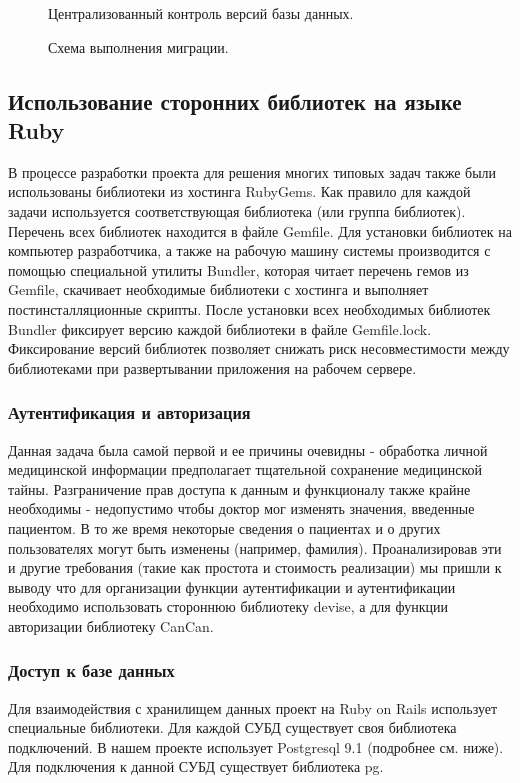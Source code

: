 \begin{figure}[h]
\caption{Централизованный контроль версий базы данных.}
\label{ris:development_migrations}
\end{figure}

\begin{figure}[h]
\caption{Схема выполнения миграции.}
\label{ris:migration_algorithm}
\end{figure}

\subsection{Использование сторонних библиотек на языке Ruby}
В процессе разработки проекта для решения многих типовых задач также были
использованы библиотеки из хостинга RubyGems. Как правило для каждой задачи
используется соответствующая библиотека (или группа библиотек). Перечень всех
библиотек находится в файле Gemfile. Для установки библиотек на компьютер
разработчика, а также на рабочую машину системы производится с помощью
специальной утилиты Bundler, которая читает перечень гемов из Gemfile, скачивает
необходимые библиотеки с хостинга и выполняет постинсталляционные скрипты. После
установки всех необходимых библиотек Bundler фиксирует версию каждой библиотеки
в файле Gemfile.lock. Фиксирование версий библиотек позволяет снижать риск
несовместимости между библиотеками при развертывании приложения на рабочем
сервере.

\subsubsection{Аутентификация и авторизация}
Данная задача была самой первой и ее причины очевидны - обработка личной
медицинской информации предполагает тщательной сохранение медицинской тайны.
Разграничение прав доступа к данным и функционалу также крайне необходимы -
недопустимо чтобы доктор мог изменять значения, введенные пациентом. В то же
время некоторые сведения о пациентах и о других пользователях могут быть
изменены (например, фамилия).
Проанализировав эти и другие требования (такие как простота и стоимость
реализации) мы пришли к выводу что для организации функции аутентификации и
аутентификации необходимо использовать стороннюю библиотеку devise, а для
функции авторизации библиотеку CanCan.

\subsubsection{Доступ к базе данных}
Для взаимодействия с хранилищем данных проект на Ruby on Rails использует
специальные библиотеки. Для каждой СУБД существует своя библиотека подключений.
В нашем проекте использует Postgresql 9.1 (подробнее см. ниже). Для подключения
к данной СУБД существует библиотека pg.
    
